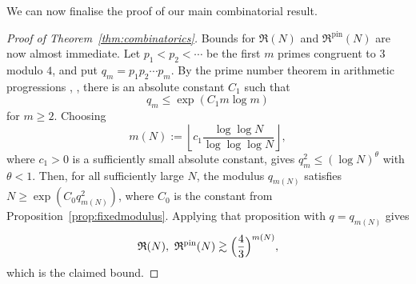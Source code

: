 \documentclass[11pt,reqno]{amsart}
\numberwithin{equation}{section}
\renewcommand{\leq}{\leqslant}
\renewcommand{\le}{\leqslant}
\renewcommand{\geq}{\geqslant}
\begin{document}
We can now finalise the proof of our main combinatorial result.

\begin{proof}[Proof of Theorem~\ref{thm:combinatorics}]
Bounds for $\mathfrak{R}(N)$ and $\mathfrak{R}^{\mathrm{pin}}(N)$ are now almost immediate.
Let $p_1<p_2<\cdots$ be the first $m$ primes congruent to $3$ modulo $4$, and put $q_m=p_1p_2\cdots p_m$. By the prime number theorem in arithmetic progressions \cite[\S20--22]{Davenport}, \cite[\S7.5]{Dujella}, there is an absolute constant $C_1$ such that
\[ q_m\le \exp(C_1m\log m) \]
for $m\geq2$.
Choosing
\[ m(N):=\left\lfloor c_1\frac{\log\log N}{\log\log\log N}\right\rfloor, \]
where $c_1>0$ is a sufficiently small absolute constant, gives $q_m^2 \leq (\log N)^{\theta}$ with $\theta < 1$. Then, for all sufficiently large $N$, the modulus $q_{m(N)}$ satisfies $N\geq \exp(C_0 q_{m(N)}^2)$, where $C_0$ is the constant from Proposition~\ref{prop:fixedmodulus}.
Applying that proposition with $q=q_{m(N)}$ gives
\[ \mathfrak{R}(N),\ \mathfrak{R}^{\mathrm{pin}}(N) \gtrsim \Bigl(\frac{4}{3}\Bigr)^{m(N)}, \]
which is the claimed bound.


\end{proof}
\end{document}
